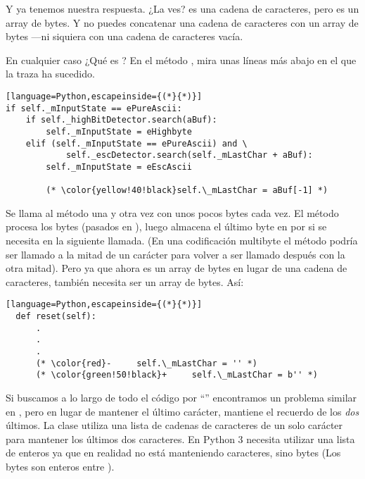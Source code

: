 Y ya tenemos nuestra respuesta. ¿La ves?  es una cadena de caracteres, pero  es un array de bytes. Y no puedes concatenar una cadena de caracteres con un array de bytes ---ni siquiera con una cadena de caracteres vacía.

En cualquier caso ¿Qué es ? En el método , mira unas líneas más abajo en el que la traza ha sucedido.


\begin{lstlisting}[language=Python,escapeinside={(*}{*)}]
if self._mInputState == ePureAscii:
    if self._highBitDetector.search(aBuf):
        self._mInputState = eHighbyte
    elif (self._mInputState == ePureAscii) and \
            self._escDetector.search(self._mLastChar + aBuf):
        self._mInputState = eEscAscii

        (* \color{yellow!40!black}self.\_mLastChar = aBuf[-1] *)
\end{lstlisting}

Se llama al método  una y otra vez con unos pocos bytes cada vez. El método procesa los bytes (pasados en ), luego almacena el último byte en  por si se necesita en la siguiente llamada. (En una codificación multibyte el método  podría ser llamado a la mitad de un carácter para volver a ser llamado después con la otra mitad). Pero ya que  ahora es un array de bytes en lugar de una cadena de caracteres,  también necesita ser un array de bytes. Así:

\begin{lstlisting}[language=Python,escapeinside={(*}{*)}]
  def reset(self):
      .
      .
      .
      (* \color{red}-     self.\_mLastChar = '' *)
      (* \color{green!50!black}+     self.\_mLastChar = b'' *)
\end{lstlisting}

Si buscamos a lo largo de todo el código por ``'' encontramos un problema similar en , pero en lugar de mantener el último carácter, mantiene el recuerdo de los \emph{dos} últimos. La clase  utiliza una lista de cadenas de caracteres de un solo carácter para mantener los últimos dos caracteres. En Python 3 necesita utilizar una lista de enteros ya que en realidad no está manteniendo caracteres, sino bytes (Los bytes son enteros entre ).


